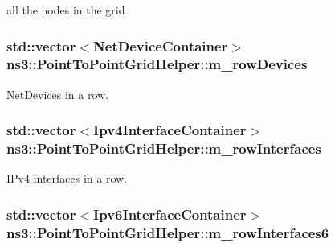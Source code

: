 all the nodes in the grid 

\subsubsection[{\texorpdfstring{m\+\_\+row\+Devices}{m_rowDevices}}]{\setlength{\rightskip}{0pt plus 5cm}std\+::vector$<${\bf Net\+Device\+Container}$>$ ns3\+::\+Point\+To\+Point\+Grid\+Helper\+::m\+\_\+row\+Devices\hspace{0.3cm}{\ttfamily [private]}}\hypertarget{classns3_1_1PointToPointGridHelper_a78e6db5145507c7afec0022097c19e3a}{}\label{classns3_1_1PointToPointGridHelper_a78e6db5145507c7afec0022097c19e3a}


Net\+Devices in a row. 

\subsubsection[{\texorpdfstring{m\+\_\+row\+Interfaces}{m_rowInterfaces}}]{\setlength{\rightskip}{0pt plus 5cm}std\+::vector$<${\bf Ipv4\+Interface\+Container}$>$ ns3\+::\+Point\+To\+Point\+Grid\+Helper\+::m\+\_\+row\+Interfaces\hspace{0.3cm}{\ttfamily [private]}}\hypertarget{classns3_1_1PointToPointGridHelper_af0f8aef3297f634a1a66751a747d1777}{}\label{classns3_1_1PointToPointGridHelper_af0f8aef3297f634a1a66751a747d1777}


I\+Pv4 interfaces in a row. 

\subsubsection[{\texorpdfstring{m\+\_\+row\+Interfaces6}{m_rowInterfaces6}}]{\setlength{\rightskip}{0pt plus 5cm}std\+::vector$<${\bf Ipv6\+Interface\+Container}$>$ ns3\+::\+Point\+To\+Point\+Grid\+Helper\+::m\+\_\+row\+Interfaces6\hspace{0.3cm}{\ttfamily [private]}}\hypertarget{classns3_1_1PointToPointGridHelper_a8241af071d3601364b9fa76eb0b136fc}{}\label{classns3_1_1PointToPointGridHelper_a8241af071d3601364b9fa76eb0b136fc}


